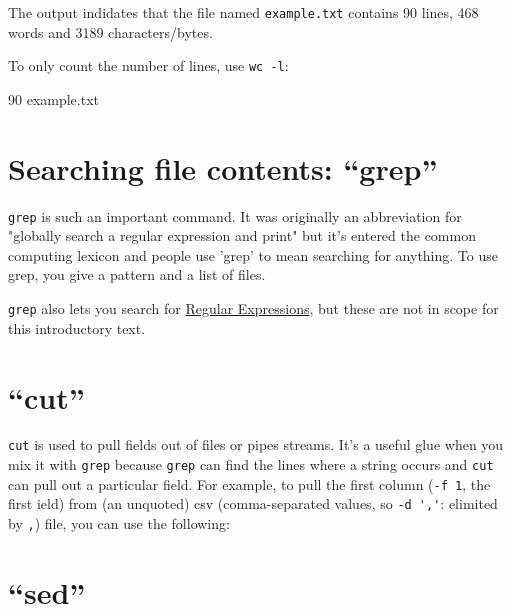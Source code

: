 The output indidates that the file named \verb|example.txt| contains 90 lines, 468 words and 3189 characters/bytes.

To only count the number of lines, use \verb|wc -l|:

\begin{prompt}
      90    example.txt
\end{prompt}

\section{Searching file contents: ``grep''}

\verb|grep| is such an important command. It was originally an abbreviation for
"globally search a regular expression and print" but it's entered the common
computing lexicon and people use 'grep' to mean searching for anything. To use
grep, you give a pattern and a list of files.

\begin{prompt}
\end{prompt}

\verb|grep| also lets you search for
\href{https://en.wikipedia.org/wiki/Regular_expression}{Regular Expressions}, but
these are not in scope for this introductory text.

\section{``cut''}

\verb|cut| is used to pull fields out of files or pipes streams.
It's a useful glue when you mix it with \verb|grep| because \verb|grep| can find the
lines where a string occurs and \verb|cut| can pull out a particular field. For
example, to pull the first column (\verb|-f 1|, the first ield)
from (an unquoted) csv (comma-separated values, so \verb|-d ','|: elimited by \verb|,|)
file, you can use the following:

\begin{prompt}
\end{prompt}

\section{``sed''}

